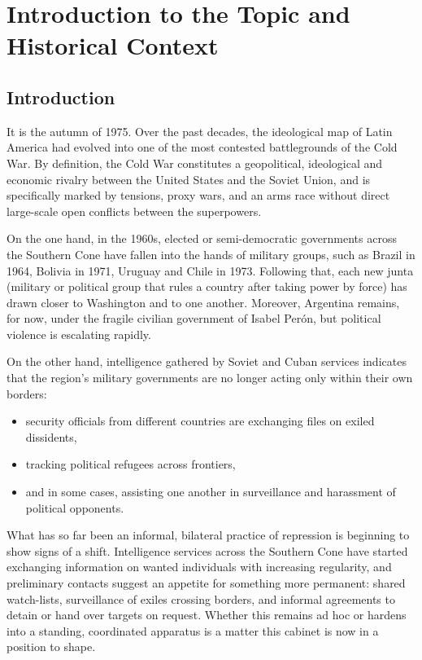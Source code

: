 \section{Introduction to the Topic and Historical Context}

\subsection{Introduction}

It is the autumn of 1975. Over the past decades, the ideological map of Latin America had evolved into one of the most contested battlegrounds of the Cold War. By definition, the Cold War constitutes a geopolitical, ideological and economic rivalry between the United States and the Soviet Union, and is specifically marked by tensions, proxy wars, and an arms race without direct large-scale open conflicts between the superpowers.

On the one hand, in the 1960s, elected or semi-democratic governments across the Southern Cone have fallen into the hands of military groups, such as Brazil in 1964, Bolivia in 1971, Uruguay and Chile in 1973. Following that, each new junta (military or political group that rules a country after taking power by force) has drawn closer to Washington and to one another. Moreover, Argentina remains, for now, under the fragile civilian government of Isabel Perón, but political violence is escalating rapidly.

On the other hand, intelligence gathered by Soviet and Cuban services indicates that the region's military governments are no longer acting only within their own borders:

\begin{itemize}
  \item security officials from different countries are exchanging files on exiled dissidents,
  \item tracking political refugees across frontiers,
  \item and in some cases, assisting one another in surveillance and harassment of political opponents.
\end{itemize}

What has so far been an informal, bilateral practice of repression is beginning to show signs of a shift. Intelligence services across the Southern Cone have started exchanging information on wanted individuals with increasing regularity, and preliminary contacts suggest an appetite for something more permanent: shared watch-lists, surveillance of exiles crossing borders, and informal agreements to detain or hand over targets on request. Whether this remains ad hoc or hardens into a standing, coordinated apparatus is a matter this cabinet is now in a position to shape.

